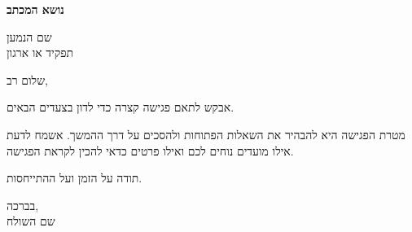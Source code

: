 \def\lakitlanguageprofile{hebrew}
\def\lakitmainlanguage{hebrew}
\def\lakitdocumentclass{article}
\def\lakitclassoptions{11pt,a4paper}
\def\lakitgeometryoptions{margin=2.2cm,headheight=14pt}
\def\lakitlinespread{1.18}
\def\lakitparagraphstyle{block}




{\LARGE\sffamily\bfseries\noindent נושא המכתב\par}\medskip
\noindent שם הנמען\\
תפקיד או ארגון\par
שלום רב,\par
אבקש לתאם פגישה קצרה כדי לדון בצעדים הבאים.

מטרת הפגישה היא להבהיר את השאלות הפתוחות ולהסכים על דרך ההמשך. אשמח לדעת
אילו מועדים נוחים לכם ואילו פרטים כדאי להכין לקראת הפגישה.

תודה על הזמן ועל ההתייחסות.\par\medskip
בברכה,\\
שם השולח

